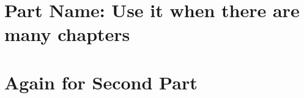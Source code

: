 \documentclass[12pt,a4paper]{Thesis} %
\begin{document}
\mainmatter       %

\fancyhead{}   %
\fancyhead[LO]{\sl{\leftmark}}
\fancyhead[RE]{\sl{\rightmark}}
\fancyhead[LE,RO]{\thepage}




\part{Part Name: Use it when there are many chapters}


\part{Again for Second Part}






\appendix %



%

\cleardoublepage    %

\end{document}
